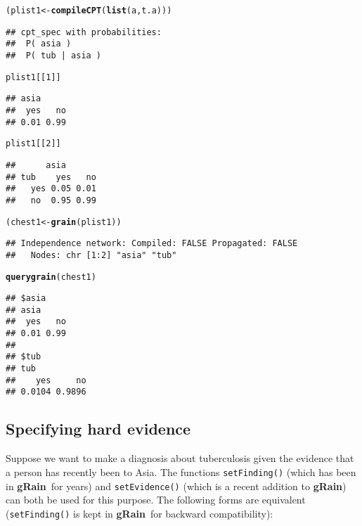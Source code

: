 \documentclass[10pt]{article}\usepackage[]{graphicx}\usepackage[]{color}
\makeatletter
\newcommand{\hlnum}[1]{\textcolor[rgb]{0.686,0.059,0.569}{#1}}%
\newcommand{\hlstd}[1]{\textcolor[rgb]{0.345,0.345,0.345}{#1}}%
\newcommand{\hlkwb}[1]{\textcolor[rgb]{0.69,0.353,0.396}{#1}}%
\newcommand{\hlkwd}[1]{\textcolor[rgb]{0.737,0.353,0.396}{\textbf{#1}}}%
\newenvironment{kframe}{%
 \def\at@end@of@kframe{}%
 \ifinner\ifhmode%
  \def\at@end@of@kframe{\end{minipage}}%
  \begin{minipage}{\columnwidth}%
 \fi\fi%
 \def\FrameCommand##1{\hskip\@totalleftmargin \hskip-\fboxsep
 \colorbox{shadecolor}{##1}\hskip-\fboxsep
     \hskip-\linewidth \hskip-\@totalleftmargin \hskip\columnwidth}%
 \MakeFramed {\advance\hsize-\width
   \@totalleftmargin\z@ \linewidth\hsize
   \@setminipage}}%
 {\par\unskip\endMakeFramed%
 \at@end@of@kframe}
\newenvironment{knitrout}{}{} %
\def\grbn{{\bf gRain}}
\def\code#1{{\texttt{#1}}}
\makeatother
\begin{document}
\begin{knitrout}
\begin{kframe}
\begin{alltt}
\hlstd{(plist1} \hlkwb{<-} \hlkwd{compileCPT}\hlstd{(}\hlkwd{list}\hlstd{(a, t.a)))}
\end{alltt}
\begin{verbatim}
## cpt_spec with probabilities:
##  P( asia )
##  P( tub | asia )
\end{verbatim}
\begin{alltt}
\hlstd{plist1[[}\hlnum{1}\hlstd{]]}
\end{alltt}
\begin{verbatim}
## asia
##  yes   no 
## 0.01 0.99
\end{verbatim}
\begin{alltt}
\hlstd{plist1[[}\hlnum{2}\hlstd{]]}
\end{alltt}
\begin{verbatim}
##      asia
## tub    yes   no
##   yes 0.05 0.01
##   no  0.95 0.99
\end{verbatim}
\begin{alltt}
\hlstd{(chest1} \hlkwb{<-} \hlkwd{grain}\hlstd{(plist1))}
\end{alltt}
\begin{verbatim}
## Independence network: Compiled: FALSE Propagated: FALSE 
##   Nodes: chr [1:2] "asia" "tub"
\end{verbatim}
\begin{alltt}
\hlkwd{querygrain}\hlstd{(chest1)}
\end{alltt}
\begin{verbatim}
## $asia
## asia
##  yes   no 
## 0.01 0.99 
## 
## $tub
## tub
##    yes     no 
## 0.0104 0.9896
\end{verbatim}
\end{kframe}
\end{knitrout}

\subsection{Specifying hard evidence}
\label{sec:hard-evidence}

Suppose we want to make a diagnosis about tuberculosis given the
evidence that a person has recently been to Asia. The functions
\code{setFinding()} (which has been in \grbn\ for years) and
\code{setEvidence()} (which is a recent addition to \grbn) can both be used for this
purpose. The following forms are equivalent (\verb|setFinding()| is kept in \grbn\ for backward compatibility):
\end{document}
